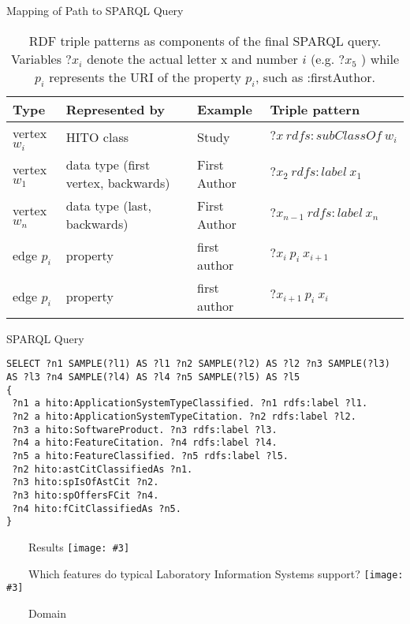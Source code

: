 \documentclass[aspectratio=1610,12pt]{beamer}
\newcommand{\imageslide}[4][]
{
\newgeometry{margin=0cm,top=1em}
\begin{frame}[plain]{~~~~#2}
\vspace{0.2em}
\centering\texttt{[image: \#3]}
\\#1
\note{#4}
\end{frame}
\restoregeometry
}
\begin{document}
\begin{frame}{Mapping of Path to SPARQL Query}
\begin{table}[ht]
\centering
\begin{tabular}{@{}llll@{}}
\toprule
Type & Represented by & Example & Triple pattern \\ \midrule
vertex $w_i$ & HITO class & Study & $?x \ rdfs:subClassOf \ w_i$ \\
vertex $w_1$ & data type (first vertex, backwards) & First Author & $?x_2 \ rdfs:label \ x_1$ \\
vertex $w_n$ & data type (last, backwards) & First Author & $?x_{n-1} \ rdfs:label \ x_n$ \\
edge $p_i$ & property & first author & $?x_i \ p_i \ x_{i+1}$ \\
edge $p_i$ & property & first author & $?x_{i+1} \ p_i \ x_i$ \\ \bottomrule
\end{tabular}
\caption{RDF triple patterns as components of the final SPARQL query. Variables $?x_i$ denote the actual letter x and number $i$ (e.g. $?x_5$ ) while $p_i$ represents the URI of the property $p_i$, such as :firstAuthor.}
\end{table}
\end{frame}

\begin{frame}[fragile]{SPARQL Query}
\begin{verbatim}
SELECT ?n1 SAMPLE(?l1) AS ?l1 ?n2 SAMPLE(?l2) AS ?l2 ?n3 SAMPLE(?l3) AS ?l3 ?n4 SAMPLE(?l4) AS ?l4 ?n5 SAMPLE(?l5) AS ?l5
{
 ?n1 a hito:ApplicationSystemTypeClassified. ?n1 rdfs:label ?l1.
 ?n2 a hito:ApplicationSystemTypeCitation. ?n2 rdfs:label ?l2.
 ?n3 a hito:SoftwareProduct. ?n3 rdfs:label ?l3.
 ?n4 a hito:FeatureCitation. ?n4 rdfs:label ?l4.
 ?n5 a hito:FeatureClassified. ?n5 rdfs:label ?l5.
 ?n2 hito:astCitClassifiedAs ?n1.
 ?n3 hito:spIsOfAstCit ?n2.
 ?n3 hito:spOffersFCit ?n4.
 ?n4 hito:fCitClassifiedAs ?n5.
}
\end{verbatim}
\end{frame}


\imageslide{Results}{img/gui2.png}{}{}
\imageslide{\large Which features do typical Laboratory Information Systems support?}{img/gui3.png}{}{}




\iffalse
{}
\begin{frame}[plain]{~~~~Domain}
\end{frame}
\restoregeometry
\end{document}
